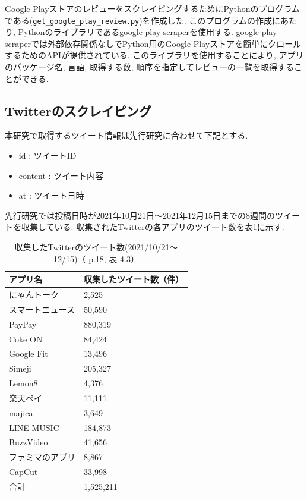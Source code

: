 Google PlayストアのレビューをスクレイピングするためにPythonのプログラムである(\verb|get_google_play_review.py|)を作成した. このプログラムの作成にあたり, Pythonのライブラリであるgoogle-play-scraperを使用する. google-play-scraperでは外部依存関係なしでPython用のGoogle Playストアを簡単にクロールするためのAPIが提供されている\cite{google-play-scraper}. 
このライブラリを使用することにより, アプリのパッケージ名, 言語, 取得する数, 順序を指定してレビューの一覧を取得することができる. 


\subsection{Twitterのスクレイピング}
\label{sec:x}
本研究で取得するツイート情報は先行研究\cite{kawatsura}に合わせて下記とする. 
\begin{itemize}
 \item id : ツイートID
 \item content : ツイート内容
 \item at : ツイート日時
\end{itemize}

先行研究では投稿日時が2021年10月21日〜2021年12月15日までの8週間のツイートを収集している. 収集されたTwitterの各アプリのツイート数を表\ref{tb:rawtweetnum}に示す. 

\begin{table}[H]
  \caption{収集したTwitterのツイート数(2021/10/21〜12/15)（\cite{kawatsura} p.18, 表 4.3）}
  \label{tb:rawtweetnum}
  \begin{center}
  \begin{tabular}{l|l}
    \hline
    アプリ名&収集したツイート数（件）\\\hline\hline
    にゃんトーク&2,525\\\hline
    スマートニュース&50,590\\\hline
    PayPay&880,319\\\hline
    Coke ON&84,424\\\hline
    Google Fit&13,496\\\hline
    Simeji&205,327\\\hline
    Lemon8&4,376\\\hline
    楽天ペイ&11,111\\\hline
    majica&3,649\\\hline
    LINE MUSIC&184,873\\\hline
    BuzzVideo&41,656\\\hline
    ファミマのアプリ&8,867\\\hline
    CapCut&33,998\\\hline\hline
    合計&1,525,211
  \end{tabular}\end{center}
\end{table}

